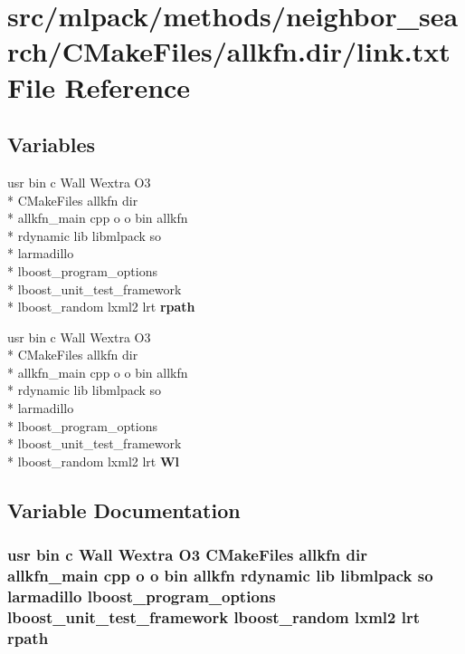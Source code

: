 \section{src/mlpack/methods/neighbor\-\_\-search/\-C\-Make\-Files/allkfn.dir/link.txt File Reference}
\label{methods_2neighbor__search_2CMakeFiles_2allkfn_8dir_2link_8txt}
\subsection*{Variables}
\begin{DoxyCompactItemize}
\item 
usr bin c Wall Wextra O3 \\*
C\-Make\-Files allkfn dir \\*
allkfn\-\_\-main cpp o o bin allkfn \\*
rdynamic lib libmlpack so \\*
larmadillo \\*
lboost\-\_\-program\-\_\-options \\*
lboost\-\_\-unit\-\_\-test\-\_\-framework \\*
lboost\-\_\-random lxml2 lrt {\bf rpath}
\item 
usr bin c Wall Wextra O3 \\*
C\-Make\-Files allkfn dir \\*
allkfn\-\_\-main cpp o o bin allkfn \\*
rdynamic lib libmlpack so \\*
larmadillo \\*
lboost\-\_\-program\-\_\-options \\*
lboost\-\_\-unit\-\_\-test\-\_\-framework \\*
lboost\-\_\-random lxml2 lrt {\bf Wl}
\end{DoxyCompactItemize}


\subsection{Variable Documentation}
\subsubsection[{rpath}]{\setlength{\rightskip}{0pt plus 5cm}usr bin c Wall Wextra O3 C\-Make\-Files allkfn dir allkfn\-\_\-main cpp o o bin allkfn rdynamic lib libmlpack so larmadillo lboost\-\_\-program\-\_\-options lboost\-\_\-unit\-\_\-test\-\_\-framework lboost\-\_\-random lxml2 lrt rpath}\label{methods_2neighbor__search_2CMakeFiles_2allkfn_8dir_2link_8txt_a47ab34a006e17df9a9fac70ccdbaade4}


